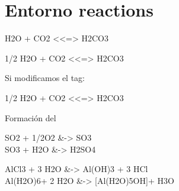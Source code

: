 \documentclass[12pt,a4paper]{article}
\begin{document}
\section{Entorno reactions}

\begin{reaction}
H2O + CO2 <<=> H2CO3
\end{reaction}

\begin{reaction*}
	1/2 H2O + CO2 <<=> H2CO3
\end{reaction*}

Si modificamos el tag:
\begin{reaction}
1/2 H2O + CO2 <<=> H2CO3
\end{reaction}

Formaci\'on del 
\begin{reactions}
SO2 + 1/2O2 &-> SO3\\
SO3 + H2O &-> H2SO4
\end{reactions}

\begin{reactions*}
AlCl3 + 3 H2O &-> Al(OH)3 \sld{} + 3 HCl \gas{} \\
Al(H2O)6\pch[3] + 2 H2O &-> [Al(H2O)5OH]\pch[2] + H3O\pch
\end{reactions*}

\listofreactions
\end{document}

